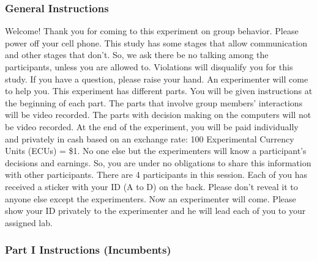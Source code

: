 \subsubsection{General Instructions}
Welcome! Thank you for coming to this experiment on group behavior. Please power off your cell phone. This study has some stages that allow communication and other stages that don’t. So, we ask there be no talking among the participants, unless you are allowed to.  Violations will disqualify you for this study. If you have a question, please raise your hand. An experimenter will come to help you.
This experiment has different parts. You will be given instructions at the beginning of each part. The parts that involve group members’ interactions will be video recorded. The parts with decision making on the computers will not be video recorded. 
At the end of the experiment, you will be paid individually and privately in cash based on an exchange rate: 
100 Experimental Currency Units (ECUs) = \$1. 
No one else but the experimenters will know a participant’s decisions and earnings. So, you are under no obligations to share this information with other participants. 
There are 4 participants in this session. Each of you has received a sticker with your ID (A to D) on the back. Please don’t reveal it to anyone else except the experimenters. Now an experimenter will come. Please show your ID privately to the experimenter and he will lead each of you to your assigned lab. 

\subsubsection{Part I Instructions (Incumbents)}
